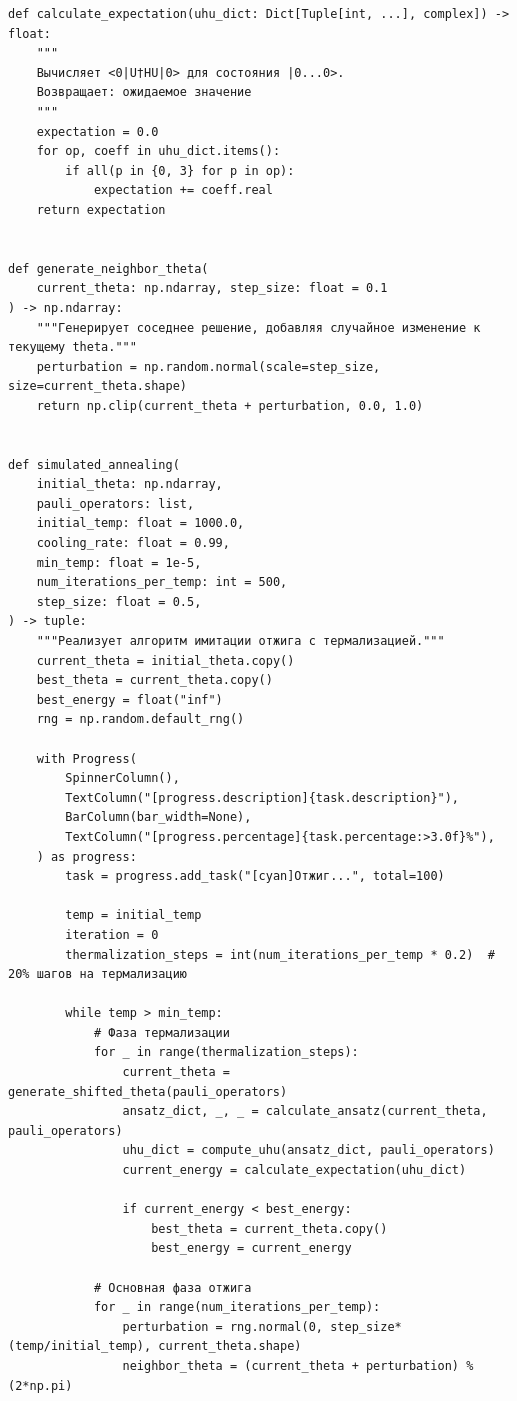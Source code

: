 \documentclass[a4paper]{report}
\begin{document}
\begin{lstlisting}
def calculate_expectation(uhu_dict: Dict[Tuple[int, ...], complex]) -> float:
    """
    Вычисляет <0|U†HU|0> для состояния |0...0>.
    Возвращает: ожидаемое значение
    """
    expectation = 0.0
    for op, coeff in uhu_dict.items():
        if all(p in {0, 3} for p in op):
            expectation += coeff.real
    return expectation


def generate_neighbor_theta(
    current_theta: np.ndarray, step_size: float = 0.1
) -> np.ndarray:
    """Генерирует соседнее решение, добавляя случайное изменение к текущему theta."""
    perturbation = np.random.normal(scale=step_size, size=current_theta.shape)
    return np.clip(current_theta + perturbation, 0.0, 1.0)


def simulated_annealing(
    initial_theta: np.ndarray,
    pauli_operators: list,
    initial_temp: float = 1000.0,
    cooling_rate: float = 0.99,
    min_temp: float = 1e-5,
    num_iterations_per_temp: int = 500,
    step_size: float = 0.5,
) -> tuple:
    """Реализует алгоритм имитации отжига с термализацией."""
    current_theta = initial_theta.copy()
    best_theta = current_theta.copy()
    best_energy = float("inf")
    rng = np.random.default_rng()

    with Progress(
        SpinnerColumn(),
        TextColumn("[progress.description]{task.description}"),
        BarColumn(bar_width=None),
        TextColumn("[progress.percentage]{task.percentage:>3.0f}%"),
    ) as progress:
        task = progress.add_task("[cyan]Отжиг...", total=100)

        temp = initial_temp
        iteration = 0
        thermalization_steps = int(num_iterations_per_temp * 0.2)  # 20% шагов на термализацию

        while temp > min_temp:
            # Фаза термализации
            for _ in range(thermalization_steps):
                current_theta = generate_shifted_theta(pauli_operators)
                ansatz_dict, _, _ = calculate_ansatz(current_theta, pauli_operators)
                uhu_dict = compute_uhu(ansatz_dict, pauli_operators)
                current_energy = calculate_expectation(uhu_dict)

                if current_energy < best_energy:
                    best_theta = current_theta.copy()
                    best_energy = current_energy

            # Основная фаза отжига
            for _ in range(num_iterations_per_temp):
                perturbation = rng.normal(0, step_size*(temp/initial_temp), current_theta.shape)
                neighbor_theta = (current_theta + perturbation) % (2*np.pi)


\end{lstlisting}
\end{document}
